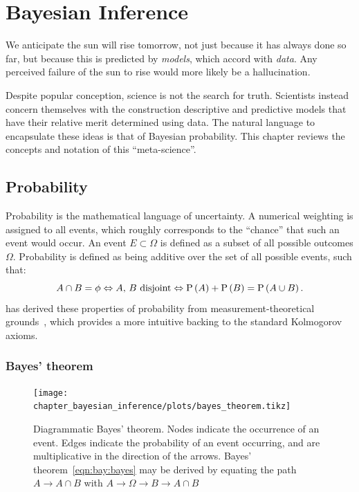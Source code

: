 \chapter{Bayesian Inference}
\label{chap:bay}

\epigraph{We anticipate the sun will rise tomorrow, not just because it has always done so far, but because this is predicted by {\em models}, which accord with {\em data}. Any perceived failure of the sun to rise would more likely be a hallucination.}{\davidmackay{}}

Despite popular conception, science is not the search for truth. Scientists instead concern themselves with the construction descriptive and predictive models that have their relative merit determined using data.
The natural language to encapsulate these ideas is that of Bayesian probability. This chapter reviews the concepts and notation of this ``meta-science''.

\section{Probability}
\label{sec:bay:prob}

Probability is the mathematical language of uncertainty. 
A numerical weighting is assigned to all events, which roughly corresponds to the ``chance'' that such an event would occur. An event $E\subset \Omega$ is defined as a subset of all possible outcomes $\Omega$. Probability is defined as being additive over the set of all possible events, such that:
\begin{equation}
  A\cap B = \phi \Leftrightarrow \text{$A$, $B$ disjoint} \Leftrightarrow \mathrm{P}\left(A\right) + \mathrm{P}\left(B\right) = \mathrm{P}\left(A\cup B\right).
\end{equation}
\johnskilling{} has derived these properties of probability from measurement-theoretical grounds~\citep[chap. 1]{Bayesian_methods_in_cosmology}, which provides a more intuitive backing to the standard Kolmogorov axioms.

\subsection{Bayes' theorem}

\begin{figure}[tbp]
  \centering
  \texttt{[image: chapter\_bayesian\_inference/plots/bayes\_theorem.tikz]}
  \caption{Diagrammatic Bayes' theorem. Nodes indicate the occurrence of an event. Edges indicate the probability of an event occurring, and are multiplicative in the direction of the arrows. Bayes' theorem~\protect\eqref{eqn:bay:bayes} may be derived by equating the path $A\to A\cap B$ with $A\to\Omega\to B\to A\cap B$}\label{fig:bay:bayes_theorem}
\end{figure}



